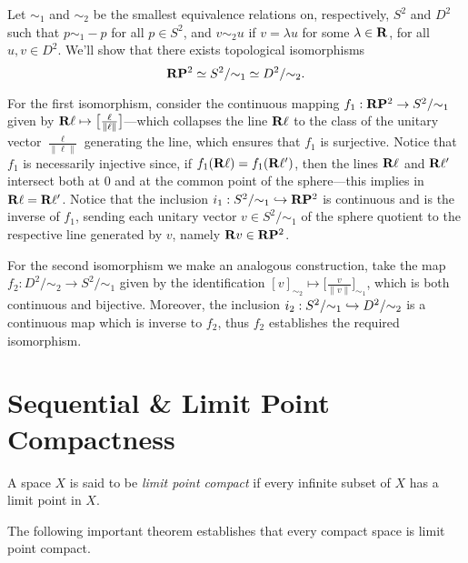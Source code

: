 \begin{example}
    \label{exp:RP2-iso-S2-D2}
    Let \(\sim_1\) and \(\sim_2\) be the smallest equivalence relations on,
    respectively, \(S^2\) and \(D^2\) such that \(p \sim_1 -p\) for all
    \(p \in S^2\), and \(v \sim_2 u\) if \(v = \lambda u\) for some
    \(\lambda \in \mathbf{R}\), for all \(u, v \in D^2\). We'll show that there exists
    topological isomorphisms
    \[
        \mathbf{R} \mathbf{P}^2 \simeq S^2/{\sim_1} \simeq D^2/{\sim_2}.
    \]

    For the first isomorphism, consider the continuous mapping
    \(f_1: \mathbf{R} \mathbf{P}^2 \to S^2/{\sim_1}\) given by
    \(\mathbf{R} \ell \mapsto \big[ \frac{\ell}{\| \ell \|}\big]\)---which collapses the
    line \(\mathbf{R} \ell\) to the class of the unitary vector \(\frac{\ell}{\| \ell \|}\)
    generating the line, which ensures that \(f_1\) is surjective. Notice that
    \(f_1\) is necessarily injective since, if \(f_1(\mathbf{R} \ell) = f_1(\mathbf{R} \ell')\),
    then the lines \(\mathbf{R} \ell\) and \(\mathbf{R} \ell'\) intersect both at \(0\) and at the
    common point of the sphere---this implies in \(\mathbf{R} \ell = \mathbf{R} \ell'\). Notice
    that the inclusion \(i_1: S^2/{\sim_1} \hookrightarrow \mathbf{R} \mathbf{P}^2\) is continuous and is
    the inverse of \(f_1\), sending each unitary vector \(v \in S^2/{\sim_1}\) of
    the sphere quotient to the respective line generated by \(v\), namely
    \(\mathbf{R} v \in \mathbf{R} \mathbf{P}^2\).

    For the second isomorphism we make an analogous construction, take the map
    \(f_2: D^2/{\sim_2} \to S^2/{\sim_1}\) given by the identification
    \([v]_{\sim_2} \mapsto \big[ \frac{v}{\| v \|} \big]_{\sim_1}\), which is both
    continuous and bijective. Moreover, the inclusion
    \(i_2: S^2/{\sim_1} \hookrightarrow D^2/{\sim_2}\) is a continuous map which is inverse to
    \(f_2\), thus \(f_2\) establishes the required isomorphism.
\end{example}

\section{Sequential \& Limit Point Compactness}

\begin{definition}
    \label{def:limit-point-compact}
    A space \(X\) is said to be \emph{limit point compact} if every infinite subset
    of \(X\) has a limit point in \(X\).
\end{definition}

The following important theorem establishes that every compact space is limit
point compact.

